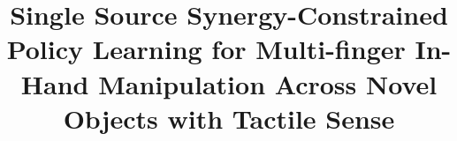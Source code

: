\documentclass[letterpaper, 10 pt, conference]{ieeeconf}  %
\title{\LARGE \bf

Single Source Synergy-Constrained Policy Learning for Multi-finger In-Hand Manipulation Across Novel Objects with Tactile Sense
}
\begin{document}
\maketitle
\thispagestyle{empty}
\pagestyle{empty}


\begin{abstract}

\end{abstract}
\end{document}
